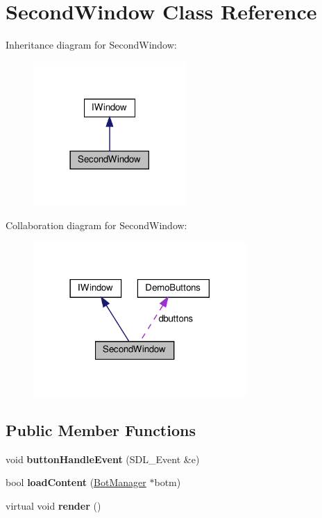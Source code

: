 \hypertarget{classSecondWindow}{}\section{Second\+Window Class Reference}
\label{classSecondWindow}


Inheritance diagram for Second\+Window\+:
\nopagebreak
\begin{figure}[H]
\begin{center}
\leavevmode
\includegraphics[width=165pt]{classSecondWindow__inherit__graph}
\end{center}
\end{figure}


Collaboration diagram for Second\+Window\+:
\nopagebreak
\begin{figure}[H]
\begin{center}
\leavevmode
\includegraphics[width=230pt]{classSecondWindow__coll__graph}
\end{center}
\end{figure}
\subsection*{Public Member Functions}
\begin{DoxyCompactItemize}
\item 
\mbox{\label{classSecondWindow_a0e26df91fdc6e0e1b51bb7968c1e7ba3}} 
void {\bfseries button\+Handle\+Event} (S\+D\+L\+\_\+\+Event \&e)
\item 
\mbox{\label{classSecondWindow_a32251bb680c0b5b97e4ce91b211209de}} 
bool {\bfseries load\+Content} (\hyperlink{classBotManager}{Bot\+Manager} $\ast$botm)
\item 
\mbox{\label{classSecondWindow_a9da00633f432116474eeab563100a895}} 
virtual void {\bfseries render} ()
\end{DoxyCompactItemize}
